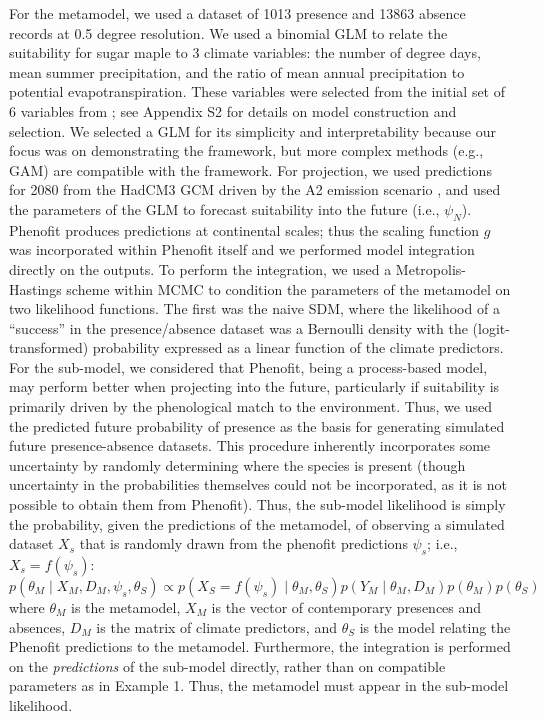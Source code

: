 \documentclass[11pt]{article}
\begin{document}
For the metamodel, we used a dataset of 1013 presence and 13863 absence records at 0.5 degree resolution.
We used a binomial GLM to relate the suitability for sugar maple to 3 climate variables: the number of degree days, mean summer precipitation, and the ratio of mean annual precipitation to potential evapotranspiration.
These variables were selected from the initial set of 6 variables from \citet{Morin2009}; see Appendix S2 for details on model construction and selection.
We selected a GLM for its simplicity and interpretability because our focus was on demonstrating the framework, but more complex methods (e.g., GAM) are compatible with the framework.
For projection, we used predictions for 2080 from the HadCM3 GCM \citep{Pope2000} driven by the A2 emission scenario \citep{Nakicenovic2000}, and used the parameters of the GLM to forecast suitability into the future (i.e., \(\psi_N\)).
Phenofit produces predictions at continental scales; thus the scaling function \(g\) was incorporated within Phenofit itself and we performed model integration directly on the outputs.
To perform the integration, we used a Metropolis-Hastings scheme within \ac{MCMC} to condition the parameters of the metamodel on two likelihood functions.
The first was the naive SDM, where the likelihood of a ``success'' in the presence/absence dataset was a Bernoulli density with the (logit-transformed) probability expressed as a linear function of the climate predictors.
For the sub-model, we considered that Phenofit, being a process-based model, may perform better when projecting into the future, particularly if suitability is primarily driven by the phenological match to the environment.
Thus, we used the predicted future probability of presence as the basis for generating simulated future presence-absence datasets.
This procedure inherently incorporates some uncertainty by randomly determining where the species is present (though uncertainty in the probabilities themselves could not be incorporated, as it is not possible to obtain them from Phenofit).
Thus, the sub-model likelihood is simply the probability, given the predictions of the metamodel, of observing a simulated dataset \(X_s\) that is randomly drawn from the phenofit predictions \(\psi_s\); i.e., \(X_s = f(\psi_s)\):
\begin{equation}
\label{eq:integrated2}
	p( \theta_M \mid X_M, D_M, \psi_s, \theta_S )
	\propto 
	p( X_S = f(\psi_s)\mid \theta_M, \theta_S )
	p( Y_M \mid \theta_M, D_M ) 
	p( \theta_M )
	p( \theta_S )
\end{equation}
where \(\theta_M\) is the metamodel, 
\(X_M\) is the vector of contemporary presences and absences, 
\(D_M\) is the matrix of climate predictors,
and \(\theta_S\) is the model relating the Phenofit predictions to the metamodel.
Furthermore, the integration is performed on the \emph{predictions} of the sub-model directly, rather than on compatible parameters as in Example 1. 
Thus, the metamodel must appear in the sub-model likelihood.
\end{document}
